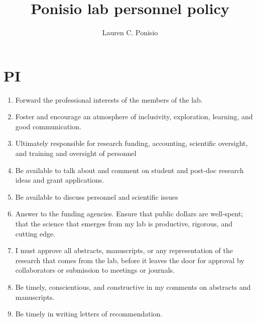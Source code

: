 \documentclass[12pt]{article}
\title{Ponisio lab personnel policy}
\author{Lauren C. Ponisio}
\begin{document}
\maketitle

\section{PI}
\begin{enumerate}
\item Forward the professional interests of the members of the lab.
\item Foster and encourage an atmosphere of inclusivity, exploration,
  learning, and good communication.
\item Ultimately responsible for research funding, accounting,
  scientific oversight, and training and oversight of personnel
\item Be available to talk about and comment on student and post-doc
  research ideas and grant applications.
\item Be available to discuss personnel and scientific issues
\item Answer to the funding agencies. Ensure that public dollars are
  well-spent; that the science that emerges from my lab is productive,
  rigorous, and cutting edge.
\item I must approve all abstracts, manuscripts, or any representation
  of the research that comes from the lab, before it leaves the door
  for approval by collaborators or submission to meetings or journals.
\item Be timely, conscientious, and constructive in my comments on
  abstracts and manuscripts.
\item Be timely in writing letters of recommendation.
\end{enumerate}
\end{document}
